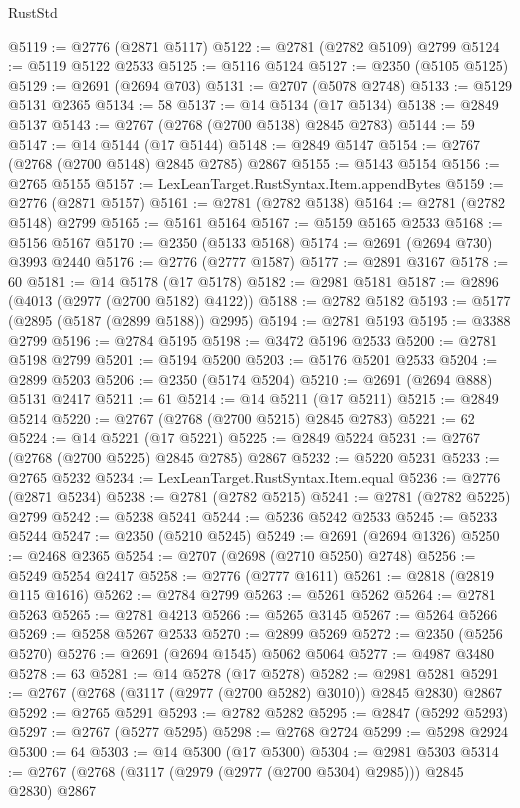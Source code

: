 \begin{lexlean}{RustStd}
\begin{coremodule}
@5119 := @2776 (@2871 @5117)
@5122 := @2781 (@2782 @5109) @2799
@5124 := @5119 @5122 @2533
@5125 := @5116 @5124
@5127 := @2350 (@5105 @5125)
@5129 := @2691 (@2694 @703)
@5131 := @2707 (@5078 @2748)
@5133 := @5129 @5131 @2365
@5134 := 58
@5137 := @14 @5134 (@17 @5134)
@5138 := @2849 @5137
@5143 := @2767 (@2768 (@2700 @5138) @2845 @2783)
@5144 := 59
@5147 := @14 @5144 (@17 @5144)
@5148 := @2849 @5147
@5154 := @2767 (@2768 (@2700 @5148) @2845 @2785) @2867
@5155 := @5143 @5154
@5156 := @2765 @5155
@5157 := LexLeanTarget.RustSyntax.Item.appendBytes
@5159 := @2776 (@2871 @5157)
@5161 := @2781 (@2782 @5138)
@5164 := @2781 (@2782 @5148) @2799
@5165 := @5161 @5164
@5167 := @5159 @5165 @2533
@5168 := @5156 @5167
@5170 := @2350 (@5133 @5168)
@5174 := @2691 (@2694 @730) @3993 @2440
@5176 := @2776 (@2777 @1587)
@5177 := @2891 @3167
@5178 := 60
@5181 := @14 @5178 (@17 @5178)
@5182 := @2981 @5181
@5187 := @2896 (@4013 (@2977 (@2700 @5182) @4122))
@5188 := @2782 @5182
@5193 := @5177 (@2895 (@5187 (@2899 @5188)) @2995)
@5194 := @2781 @5193
@5195 := @3388 @2799
@5196 := @2784 @5195
@5198 := @3472 @5196 @2533
@5200 := @2781 @5198 @2799
@5201 := @5194 @5200
@5203 := @5176 @5201 @2533
@5204 := @2899 @5203
@5206 := @2350 (@5174 @5204)
@5210 := @2691 (@2694 @888) @5131 @2417
@5211 := 61
@5214 := @14 @5211 (@17 @5211)
@5215 := @2849 @5214
@5220 := @2767 (@2768 (@2700 @5215) @2845 @2783)
@5221 := 62
@5224 := @14 @5221 (@17 @5221)
@5225 := @2849 @5224
@5231 := @2767 (@2768 (@2700 @5225) @2845 @2785) @2867
@5232 := @5220 @5231
@5233 := @2765 @5232
@5234 := LexLeanTarget.RustSyntax.Item.equal
@5236 := @2776 (@2871 @5234)
@5238 := @2781 (@2782 @5215)
@5241 := @2781 (@2782 @5225) @2799
@5242 := @5238 @5241
@5244 := @5236 @5242 @2533
@5245 := @5233 @5244
@5247 := @2350 (@5210 @5245)
@5249 := @2691 (@2694 @1326)
@5250 := @2468 @2365
@5254 := @2707 (@2698 (@2710 @5250) @2748)
@5256 := @5249 @5254 @2417
@5258 := @2776 (@2777 @1611)
@5261 := @2818 (@2819 @115 @1616)
@5262 := @2784 @2799
@5263 := @5261 @5262
@5264 := @2781 @5263
@5265 := @2781 @4213
@5266 := @5265 @3145
@5267 := @5264 @5266
@5269 := @5258 @5267 @2533
@5270 := @2899 @5269
@5272 := @2350 (@5256 @5270)
@5276 := @2691 (@2694 @1545) @5062 @5064
@5277 := @4987 @3480
@5278 := 63
@5281 := @14 @5278 (@17 @5278)
@5282 := @2981 @5281
@5291 := @2767 (@2768 (@3117 (@2977 (@2700 @5282) @3010)) @2845 @2830) @2867
@5292 := @2765 @5291
@5293 := @2782 @5282
@5295 := @2847 (@5292 @5293)
@5297 := @2767 (@5277 @5295)
@5298 := @2768 @2724
@5299 := @5298 @2924
@5300 := 64
@5303 := @14 @5300 (@17 @5300)
@5304 := @2981 @5303
@5314 := @2767 (@2768 (@3117 (@2979 (@2977 (@2700 @5304) @2985))) @2845 @2830) @2867

\end{coremodule}
\end{lexlean}

